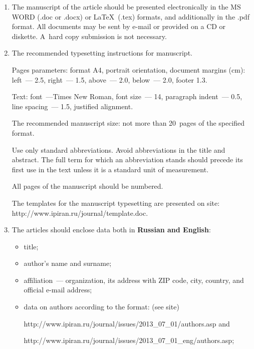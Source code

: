 {{\begin{enumerate}[1.]
\item The manuscript of the article should be presented electronically in the MS WORD (.doc or 
.docx) or \LaTeX\ (.tex) formats, and additionally in the .pdf format. All documents
 may be sent 
by e-mail or provided on a CD or diskette. A~hard copy submission is not necessary.\\[-13.5pt]

\item The recommended typesetting instructions for manuscript.

Pages parameters: format A4, portrait orientation, document margins (cm): left~--- 2.5, right~--- 
1.5, above~--- 2.0, below~--- 2.0, footer 1.3. 

Text: font~---Times New Roman, font size~--- 14, paragraph indent~--- 0.5, line spacing~--- 1.5, 
justified alignment. 

The recommended manuscript size: not more than 20~pages of the specified format. 

Use only standard abbreviations. Avoid  abbreviations in the title and
abstract. The full term for which an abbreviation stands should precede
its first use in the text unless it is a standard unit of measurement. 

All pages of the manuscript should be numbered.

The templates for the manuscript typesetting are presented on site: {\sf 
http://www.ipiran.ru/journal/template.doc}.\\[-13.5pt]

\thispagestyle{empty}

\item The articles should enclose data both in \textbf{Russian and English}:
\begin{itemize}
\item title;\\[-13.5pt]
\item author's name and surname;\\[-13.5pt]
\item affiliation~--- organization, its address with ZIP code, city, country, and 
official e-mail address;\\[-13.5pt]
\item data on authors according to the format: (see site) 

{\sf http://www.ipiran.ru/journal/issues/2013\_07\_01/authors.asp}  and 

{\sf  http://www.ipiran.ru/journal/issues/2013\_07\_01\_eng/authors.asp};\\[-13.5pt]


\end{itemize}
\end{enumerate}}}
